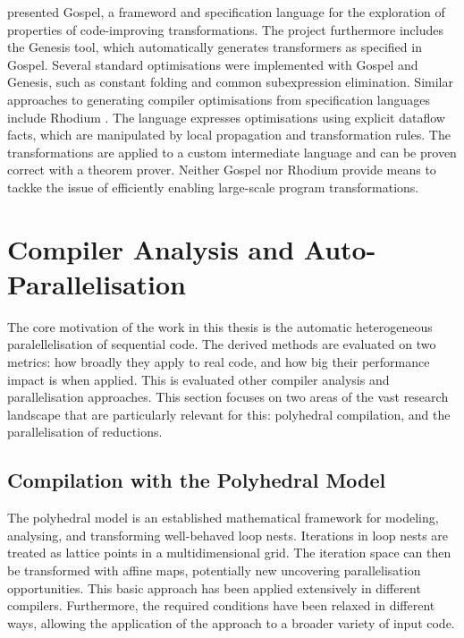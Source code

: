     \citet{Whitfield:1997:AEC:267959.267960} presented Gospel, a frameword and
    specification language for the exploration of properties of code-improving
    transformations.
    The project furthermore includes the Genesis tool, which automatically
    generates transformers as specified in Gospel.
    Several standard optimisations were implemented with Gospel and Genesis,
    such as constant folding and common subexpression elimination.
    Similar approaches to generating compiler optimisations from specification
    languages include Rhodium \citep{Lerner:2005:ASP:1040305.1040335}.
    The language expresses optimisations using explicit dataflow facts, which
    are manipulated by local propagation and transformation rules.
    The transformations are applied to a custom intermediate language and can
    be proven correct with a theorem prover.
    Neither Gospel nor Rhodium provide means to tackke the issue of efficiently
    enabling large-scale program transformations.

\section{Compiler Analysis and Auto-Parallelisation}

    The core motivation of the work in this thesis is the automatic
    heterogeneous paralellelisation of sequential code.
    The derived methods are evaluated on two metrics: how broadly they apply to
    real code, and how big their performance impact is when applied.
    This is evaluated other compiler analysis and parallelisation
    approaches.
    This section focuses on two areas of the vast research landscape
    that are particularly relevant for this: polyhedral compilation, and the
    parallelisation of reductions.

\subsection{Compilation with the Polyhedral Model}

    The polyhedral model \citep{Karp:1967:OCU:321406.321418} is an established
    mathematical framework for modeling, analysing, and transforming
    well-behaved loop nests.
    Iterations in loop nests are treated as lattice points in a multidimensional
    grid.
    The iteration space can then be transformed with affine maps, potentially
    new uncovering parallelisation opportunities.
    This basic approach has been applied extensively in different compilers.
    Furthermore, the required conditions have been relaxed in different ways,
    allowing the application of the approach to a broader variety of input code.

